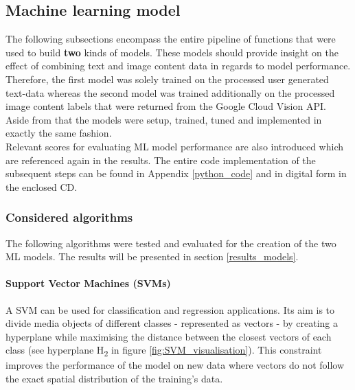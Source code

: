 \subsection{Machine learning model} \label{ml_model}
The following subsections encompass the entire pipeline of functions that were used to build \textbf{two} kinds of models. These models should provide insight on the effect of combining text and image content data in regards to model performance. Therefore, the first model was solely trained on the processed user generated text-data whereas the second model was trained additionally on the processed image content labels that were returned from the Google Cloud Vision API. Aside from that the models were setup, trained, tuned and implemented in exactly the same fashion.\\
Relevant scores for evaluating ML model performance are also introduced which are referenced again in the results. The entire code implementation of the subsequent steps can be found in Appendix \ref{python_code} and in digital form in the enclosed CD.

\subsubsection*{Considered algorithms} \label{ml_algorithms}
The following algorithms were tested and evaluated for the creation of the two ML models. The results will be presented in section \ref{results_models}.

\paragraph*{Support Vector Machines (SVMs)}
A SVM can be used for classification and regression applications. Its aim is to divide media objects of different classes - represented as vectors - by creating a hyperplane while maximising the distance between the closest vectors of each class (see hyperplane H\textsubscript{2} in figure \ref{fig:SVM_visualisation}). This constraint improves the performance of the model on new data where vectors do not follow the exact spatial distribution of the training's data.

